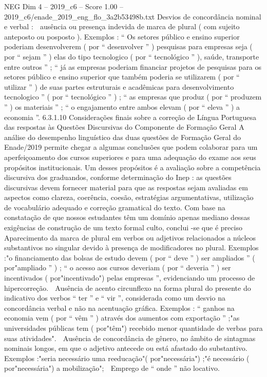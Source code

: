 \begin{textsample}{NEG Dim 4 – 2019\_c6 – Score 1.00 – 2019\_c6/enade\_2019\_eng\_flo\_3a2b53498b.txt}
Desvios de concordância nominal e verbal :  ausência ou presença indevida de marca de plural ( com sujeito anteposto ou posposto ).
Exemplos : “ Os setores público e ensino superior poderiam desenvolverem ( por “ desenvolver ” ) pesquisas para empresas seja ( por “ sejam ” ) elas do tipo tecnologico ( por “ tecnológico ” ), saúde, transporte entre outros ” ; “ já as empresas poderiam financiar projetos de pesquisas para os setores público e ensino superior que também poderia se utilizarem ( por “ utilizar ” ) de suas partes estruturais e acadêmicas para desenvolvimento tecnologico ” ( por “ tecnológico ” ) ; “ as empresas que produz ( por “ produzem ” ) os materiais ” ; “ o engajamento entre ambos elevam ( por “ eleva ” ) a economia ”. 6.3.1.10 Considerações finais sobre a correção de Língua Portuguesa das respostas às Questões Discursivas do Componente de Formação Geral A análise do desempenho linguístico das duas questões de Formação Geral do Enade/2019 permite chegar a algumas conclusões que podem colaborar para um aperfeiçoamento dos cursos superiores e para uma adequação do exame aos seus propósitos institucionais.
Um desses propósitos é a avaliação sobre a competência discursiva dos graduandos, conforme determinação do Inep : as questões discursivas devem fornecer material para que as respostas sejam avaliadas em aspectos como clareza, coerência, coesão, estratégias argumentativas, utilização de vocabulário adequado e correção gramatical do texto.
Com base na constatação de que nossos estudantes têm um domínio apenas mediano dessas exigências de construção de um texto formal culto, conclui -se que é preciso  Aparecimento da marca de plural em verbos ou adjetivos relacionados a núcleos substantivos no singular devido à presença de modificadores no plural.
Exemplos :"o financiamento das bolsas de estudo devem ( por “ deve ” ) ser ampliados ” ( por"ampliado ” ) ; “ o acesso aos cursos deveriam ( por “ deveria ” ) ser incentivados ( por"incentivado") pelas empresas ”, evidenciando um processo de hipercorreção.  Ausência de acento circunflexo na forma plural do presente do indicativo dos verbos “ ter ” e “ vir ”, considerada como um desvio na concordância verbal e não na acentuação gráfica.
Exemplos : “ ganhos na economia vem ( por “ vêm ” ) através dos aumentos com exportação ” ;"as universidades públicas tem ( por"têm") recebido menor quantidade de verbas para suas atividades".  Ausência de concordância de gênero, no âmbito de sintagmas nominais longos, em que o adjetivo antecede ou está afastado do substantivo.
Exemplos :"seria necessário uma reeducação"( por"necessária") ;"é necessário ( por"necessária") a mobilização";  Emprego de “ onde ” não locativo.

\end{textsample}
